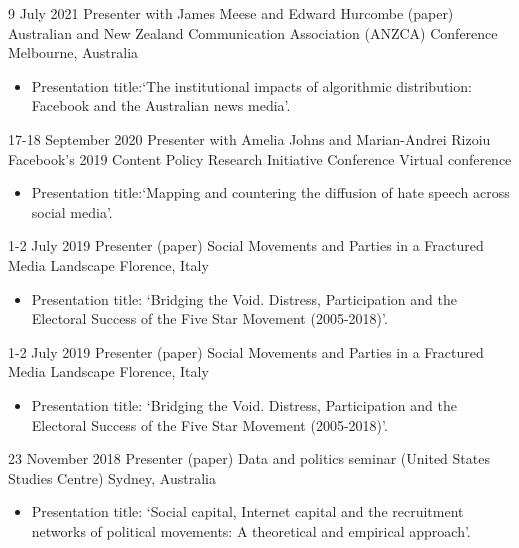 \documentclass[12pt,a4paper,sans]{moderncv}
\begin{document}
\cventry %
{9 July 2021}
{Presenter with James Meese and Edward Hurcombe (paper)}
{Australian and New Zealand Communication Association (ANZCA) Conference}
{Melbourne, Australia}
{}
       {
      \begin{itemize} %
        \item {Presentation title:`The institutional impacts of algorithmic distribution: Facebook and the Australian news media'.}
      \end{itemize}
    }


\cventry
{17-18 September 2020}
{Presenter with Amelia Johns and Marian-Andrei Rizoiu}
{Facebook's 2019 Content Policy Research Initiative Conference}
{Virtual conference}
{}
       {
      \begin{itemize} %
        \item {Presentation title:`Mapping and countering the diffusion of hate speech across social media'.}
      \end{itemize}
    }


\cventry
    {1-2 July 2019} %
    {Presenter (paper)} %
    {Social Movements and Parties in a Fractured Media Landscape} %
    {Florence, Italy} %
        {}
        {
      \begin{itemize} %
        \item {Presentation title: `Bridging the Void. Distress, Participation and the
Electoral Success of the Five Star Movement (2005-2018)'.}
      \end{itemize}
    }


    \cventry
        {1-2 July 2019} 
    {Presenter (paper)} %
    {Social Movements and Parties in a Fractured Media Landscape} %
    {Florence, Italy} %
        {}
    {
      \begin{itemize} %
        \item {Presentation title: `Bridging the Void. Distress, Participation and the
Electoral Success of the Five Star Movement (2005-2018)'.}
      \end{itemize}
    }
 
    \cventry
       {23 November 2018} %
    {Presenter (paper)} %
    {Data and politics seminar (United States Studies Centre)} %
    {Sydney, Australia} %
 {}
    {
      \begin{itemize} %
        \item {Presentation title: `Social capital, Internet capital and the recruitment networks of political movements: A theoretical and empirical approach'.}
      \end{itemize}
    }
\end{document}
